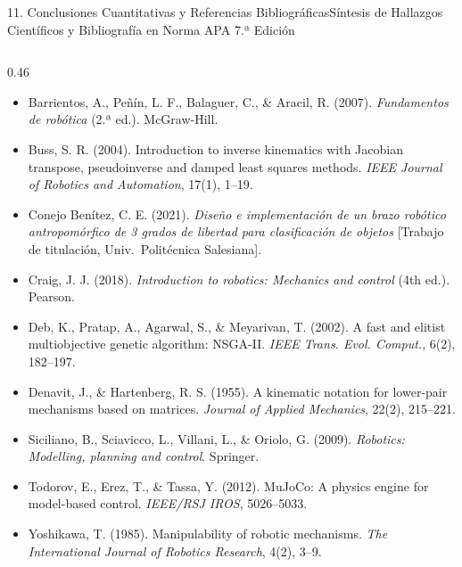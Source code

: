 \documentclass[aspectratio=169,10pt,xcolor=table]{beamer}
\begin{document}
\begin{frame}{11. Conclusiones Cuantitativas y Referencias Bibliográficas}{Síntesis de Hallazgos Científicos y Bibliografía en Norma APA 7.ª Edición}
\begin{columns}[T,totalwidth=\textwidth]
  \begin{column}{0.46\textwidth}
    \begin{cajadef}
      \fontsize{5.3}{6.3}\selectfont
      \begin{itemize}\setlength{\itemsep}{0.5pt}
        \item Barrientos, A., Peñín, L. F., Balaguer, C., \& Aracil, R. (2007). \emph{Fundamentos de robótica} (2.ª ed.). McGraw-Hill.
        \item Buss, S. R. (2004). Introduction to inverse kinematics with Jacobian transpose, pseudoinverse and damped least squares methods. \emph{IEEE Journal of Robotics and Automation}, 17(1), 1--19.
        \item Conejo Benítez, C. E. (2021). \emph{Diseño e implementación de un brazo robótico antropomórfico de 3 grados de libertad para clasificación de objetos} [Trabajo de titulación, Univ.\ Politécnica Salesiana].
        \item Craig, J. J. (2018). \emph{Introduction to robotics: Mechanics and control} (4th ed.). Pearson.
        \item Deb, K., Pratap, A., Agarwal, S., \& Meyarivan, T. (2002). A fast and elitist multiobjective genetic algorithm: NSGA-II. \emph{IEEE Trans. Evol. Comput.}, 6(2), 182--197.
        \item Denavit, J., \& Hartenberg, R. S. (1955). A kinematic notation for lower-pair mechanisms based on matrices. \emph{Journal of Applied Mechanics}, 22(2), 215--221.
        \item Siciliano, B., Sciavicco, L., Villani, L., \& Oriolo, G. (2009). \emph{Robotics: Modelling, planning and control}. Springer.
        \item Todorov, E., Erez, T., \& Tassa, Y. (2012). MuJoCo: A physics engine for model-based control. \emph{IEEE/RSJ IROS}, 5026--5033.
        \item Yoshikawa, T. (1985). Manipulability of robotic mechanisms. \emph{The International Journal of Robotics Research}, 4(2), 3--9.
      \end{itemize}
    \end{cajadef}
  \end{column}
\end{columns}
\end{frame}
\end{document}
